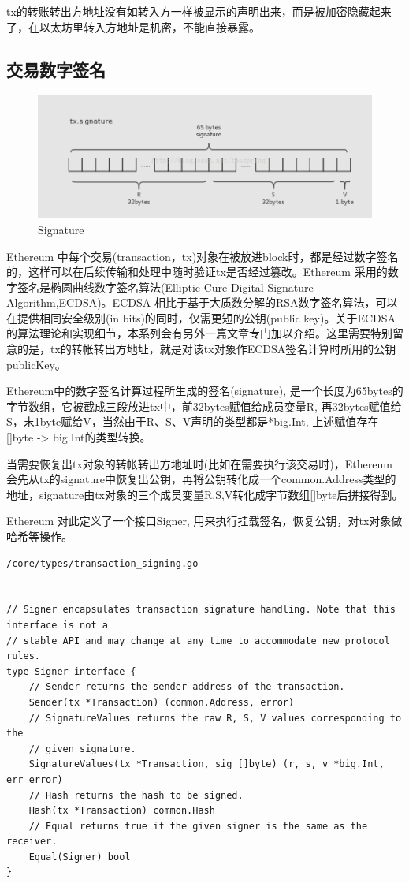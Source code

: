 \documentclass[UTF8]{ctexart}
\begin{document}
tx的转账转出方地址没有如转入方一样被显示的声明出来，而是被加密隐藏起来了，在以太坊里转入方地址是机密，不能直接暴露。

\subsection{交易数字签名}

\begin{figure}
	\centering
	\includegraphics[scale=0.4]{signature.png}
	\caption{Signature}
	\label{signature}
\end{figure}

Ethereum 中每个交易(transaction，tx)对象在被放进block时，都是经过数字签名的，这样可以在后续传输和处理中随时验证tx是否经过篡改。Ethereum 采用的数字签名是椭圆曲线数字签名算法(Elliptic Cure Digital Signature Algorithm,ECDSA)。ECDSA 相比于基于大质数分解的RSA数字签名算法，可以在提供相同安全级别(in bits)的同时，仅需更短的公钥(public key)。关于ECDSA的算法理论和实现细节，本系列会有另外一篇文章专门加以介绍。这里需要特别留意的是，tx的转帐转出方地址，就是对该tx对象作ECDSA签名计算时所用的公钥publicKey。

Ethereum中的数字签名计算过程所生成的签名(signature), 是一个长度为65bytes的字节数组，它被截成三段放进tx中，前32bytes赋值给成员变量R, 再32bytes赋值给S，末1byte赋给V，当然由于R、S、V声明的类型都是*big.Int, 上述赋值存在[]byte -> big.Int的类型转换。

当需要恢复出tx对象的转帐转出方地址时(比如在需要执行该交易时)，Ethereum 会先从tx的signature中恢复出公钥，再将公钥转化成一个common.Address类型的地址，signature由tx对象的三个成员变量R,S,V转化成字节数组[]byte后拼接得到。

Ethereum 对此定义了一个接口Signer, 用来执行挂载签名，恢复公钥，对tx对象做哈希等操作。

\begin{lstlisting}
/core/types/transaction_signing.go


// Signer encapsulates transaction signature handling. Note that this interface is not a
// stable API and may change at any time to accommodate new protocol rules.
type Signer interface {
	// Sender returns the sender address of the transaction.
	Sender(tx *Transaction) (common.Address, error)
	// SignatureValues returns the raw R, S, V values corresponding to the
	// given signature.
	SignatureValues(tx *Transaction, sig []byte) (r, s, v *big.Int, err error)
	// Hash returns the hash to be signed.
	Hash(tx *Transaction) common.Hash
	// Equal returns true if the given signer is the same as the receiver.
	Equal(Signer) bool
}
\end{lstlisting}
\end{document}
